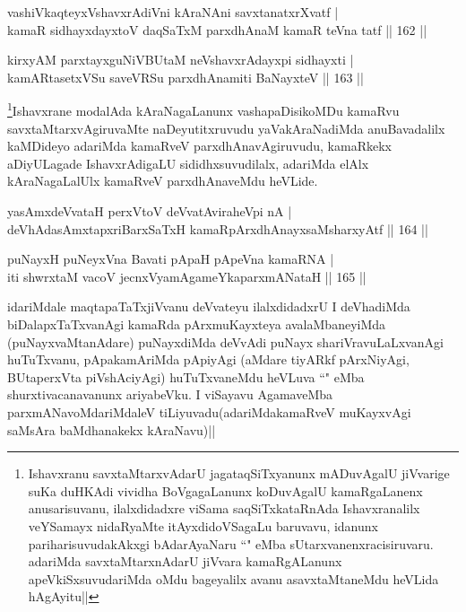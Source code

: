 \begin{shl}
vashiVkaqteyxVshavxrAdiVni kAraNAni savxtanatxrXvatf |\\
kamaR sidhayxdayxtoV daqSaTxM parxdhAnaM kamaR teVna tatf \hfill || 162 ||
\end{shl}

\begin{shl}
kirxyAM parxtayxguNiVBUtaM neVshavxrAdayxpi sidhayxti |\\
kamARtasetxVSu saveVRSu parxdhAnamiti BaNayxteV \hfill || 163 ||
\end{shl}

\begin{artha}
\footnote{Ishavxranu savxtaMtarxvAdarU jagataqSiTxyanunx mADuvAgalU jiVvarige suKa duHKAdi vividha BoVgagaLanunx koDuvAgalU kamaRgaLanenx anusarisuvanu, ilalxdidadxre viSama saqSiTxkataRnAda Ishavxranalilx veYSamayx nidaRyaMte itAyxdidoVSagaLu baruvavu, idanunx pariharisuvudakAkxgi bAdarAyaNaru ``\stext" eMba sUtarxvanenxracisiruvaru. adariMda savxtaMtarxnAdarU jiVvara kamaRgALanunx apeVkiSxsuvudariMda oMdu bageyalilx avanu asavxtaMtaneMdu heVLida hAgAyitu||}Ishavxrane modalAda kAraNagaLanunx vashapaDisikoMDu kamaRvu savxtaMtarxvAgiruvaMte naDeyutitxruvudu yaVakAraNadiMda anuBavadalilx kaMDideyo adariMda kamaRveV parxdhAnavAgiruvudu, kamaRkekx aDiyULagade IshavxrAdigaLU sididhxsuvudilalx, adariMda elAlx kAraNagaLalUlx kamaRveV parxdhAnaveMdu heVLide.
\end{artha}


\begin{shl}
yasAmxdeVvataH perxVtoV deVvatAviraheV\s pi nA |\\
deVhAdasAmxtapxriBarxSaTxH kamaRpArxdhAnayxsaMsharxyAtf \hfill || 164 ||
\end{shl}

\begin{shl}
puNayxH puNeyxVna Bavati pApaH pApeVna kamaRNA |\\
iti shwrxtaM vacoV jecnxVyamAgameYkaparxmANataH \hfill || 165 ||
\end{shl}

\begin{artha}
idariMdale maqtapaTaTxjiVvanu deVvateyu ilalxdidadxrU I deVhadiMda biDalapxTaTxvanAgi kamaRda pArxmuKayxteya avalaMbaneyiMda (puNayxvaMtanAdare) puNayxdiMda deVvAdi puNayx shariVravuLaLxvanAgi huTuTxvanu, pApakamAriMda pApiyAgi (aMdare tiyARkf pArxNiyAgi, BUtaperxVta piVshAciyAgi) huTuTxvaneMdu heVLuva ``\stext" eMba shurxtivacanavanunx ariyabeVku. I viSayavu AgamaveMba parxmANavoMdariMdaleV tiLiyuvadu(adariMdakamaRveV muKayxvAgi saMsAra baMdhanakekx kAraNavu)||
\end{artha}

